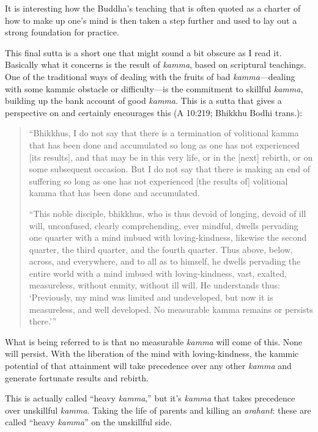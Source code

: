 It is interesting how the Buddha’s teaching that is often quoted as a
charter of how to make up one’s mind is then taken a step further and
used to lay out a strong foundation for practice.

This final sutta is a short one that might sound a bit obscure as I read
it. Basically what it concerns is the result of \emph{kamma}, based on
scriptural teachings. One of the traditional ways of dealing with the
fruits of bad \emph{kamma}—dealing with some kammic obstacle or
difficulty—is the commitment to skillful \emph{kamma}, building up the
bank account of good \emph{kamma}. This is a sutta that gives a
perspective on and certainly encourages this (A 10:219; Bhikkhu Bodhi
trans.):

\begin{quotation}
“Bhikkhus, I do not say that there is a termination of volitional kamma
that has been done and accumulated so long as one has not experienced
{[}its results{]}, and that may be in this very life, or in the
{[}next{]} rebirth, or on some subsequent occasion. But I do not say
that there is making an end of suffering so long as one has not
experienced {[}the results of{]} volitional kamma that has been done and
accumulated.

“This noble disciple, bhikkhus, who is thus devoid of longing, devoid of
ill will, unconfused, clearly comprehending, ever mindful, dwells
pervading one quarter with a mind imbued with loving-kindness, likewise
the second quarter, the third quarter, and the fourth quarter. Thus
above, below, across, and everywhere, and to all as to himself, he
dwells pervading the entire world with a mind imbued with
loving-kindness, vast, exalted, measureless, without enmity, without ill
will. He understands thus: ‘Previously, my mind was limited and
undeveloped, but now it is measureless, and well developed. No
measurable kamma remains or persists there.’”
\end{quotation}

What is being referred to is that no measurable \emph{kamma} will come
of this. None will persist. With the liberation of the mind with
loving-kindness, the kammic potential of that attainment will take
precedence over any other \emph{kamma} and generate fortunate results
and rebirth.

This is actually called “heavy \emph{kamma},” but it’s \emph{kamma} that
takes precedence over unskillful \emph{kamma}. Taking the life of
parents and killing an \emph{arahant}: these are called “heavy
\emph{kamma}” on the unskillful side.

